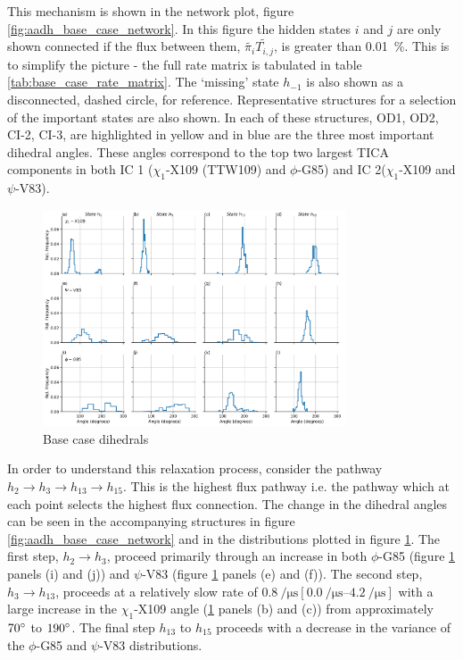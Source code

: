  This mechanism is shown in the network plot, figure \ref{fig:aadh_base_case_network}. In this figure the hidden states $i$ and $j$ are only shown connected if the flux between them, $\tilde{\pi_{i}}\tilde{T_{i,j}}$, is greater than \SI{0.01}{\percent}. This is to simplify the picture - the full rate matrix is tabulated in table \ref{tab:base_case_rate_matrix}. The `missing' state $h_{-1}$ is also shown as a disconnected, dashed circle, for reference. Representative structures for a selection of the important states are also shown. In each of these structures, OD1, OD2, CI-2, CI-3, are highlighted in yellow and in blue are the three most important dihedral angles. These angles correspond to the top two largest TICA components in both IC 1 ($\chi_1$-X109 (TTW109) and $\phi$-G85) and IC 2($\chi_1$-X109 and $\psi$-V83). 
 
\begin{figure}
    
    \centering
    \caption{Base case dihedrals}
    \label{fig:aadh_base_case_dihedrals}
    \includegraphics[width=0.8\textwidth]{chapters/aadh/figures/base_case_important_dihedrals.png}
\end{figure}

 In order to understand this relaxation process, consider the pathway $h_{2}\rightarrow h_{3} \rightarrow h_{13} \rightarrow h_{15}$. This is the highest flux pathway i.e. the pathway which at each point selects the highest flux connection. The change in the dihedral angles can be seen in the accompanying structures in figure \ref{fig:aadh_base_case_network} and in the distributions plotted in figure \ref{fig:aadh_base_case_dihedrals}.
 The first step, $h_2 \rightarrow h_{3}$, proceed primarily through an increase in both $\phi$-G85 (figure \ref{fig:aadh_base_case_dihedrals} panels (i) and (j)) and $\psi$-V83 (figure \ref{fig:aadh_base_case_dihedrals} panels (e) and (f)). The second step, $h_{3} \rightarrow h_{13}$, proceeds at a relatively slow rate of  $\SI{0.8}{\per\micro\second} [\SIrange[range-phrase=-]{0.0}{4.2}{\per\micro\second}]$ with a large increase in the $\chi_1$-X109 angle (\ref{fig:aadh_base_case_dihedrals} panels (b) and (c)) from approximately $70\degree$ to $190\degree$. The final step $h_{13}$ to $h_{15}$ proceeds with a decrease in the variance of the $\phi$-G85 and $\psi$-V83 distributions.

